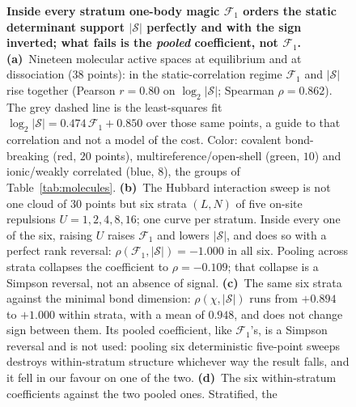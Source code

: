 
\begin{figure}[tp]\centering

\caption{\label{fig:decoupling}\textbf{Inside every stratum one-body magic $\mathcal F_1$ orders the
static determinant support $|\mathcal S|$ perfectly and with the sign inverted; what fails is the
\emph{pooled} coefficient, not $\mathcal F_1$.}
\textbf{(a)}~Nineteen molecular active spaces at equilibrium and at dissociation ($38$ points):
in the static-correlation regime $\mathcal F_1$ and $|\mathcal S|$ rise together
(Pearson $r=0.80$ on $\log_2|\mathcal S|$; Spearman $\rho=0.862$). The grey dashed line is the least-squares fit $\log_2|\mathcal S|=0.474\,\mathcal F_1+0.850$ over those same points, a guide to that correlation and not a model of the cost. Color: covalent bond-breaking (red, $20$ points), multireference/open-shell (green, $10$) and ionic/weakly correlated (blue, $8$), the groups of Table~\ref{tab:molecules}.
\textbf{(b)}~The Hubbard interaction sweep is not one cloud of $30$ points but six strata
$(L,N)$ of five on-site repulsions $U=1,2,4,8,16$; one curve per stratum. Inside every one of
the six, raising $U$ raises $\mathcal F_1$ and lowers $|\mathcal S|$, and does so with a perfect
rank reversal: $\rho(\mathcal F_1,|\mathcal S|)=-1.000$ in all six. Pooling across strata
collapses the coefficient to $\rho=-0.109$; that collapse is a Simpson reversal, not an absence
of signal.
\textbf{(c)}~The same six strata against the minimal bond dimension: $\rho(\chi,|\mathcal S|)$
runs from $+0.894$ to $+1.000$ within strata, with a mean of $0.948$, and does not change sign between
them. Its pooled coefficient, like $\mathcal F_1$'s, is a Simpson reversal and is not used: pooling six
deterministic five-point sweeps destroys within-stratum structure whichever way the result falls, and
it fell in our favour on one of the two.
\textbf{(d)}~The six within-stratum coefficients against the two pooled ones. Stratified, the
}
\end{figure}
